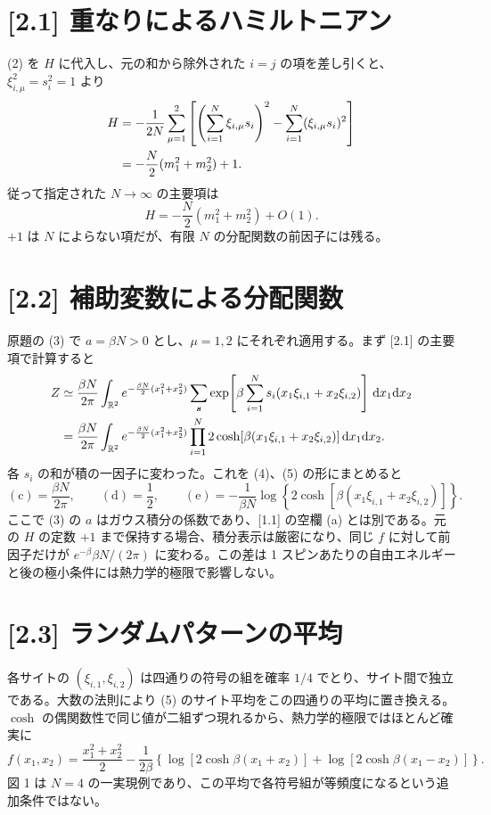 \documentclass[11pt,a4paper]{article}
\begin{document}
\section*{[2.1] 重なりによるハミルトニアン}
(2) を $H$ に代入し、元の和から除外された $i=j$ の項を差し引くと、$\xi_{i,\mu}^2=s_i^2=1$ より
\begin{align}
H&=-\frac{1}{2N}\sum_{\mu=1}^2
\left[\left(\sum_{i=1}^N\xi_{i,\mu}s_i\right)^2
-\sum_{i=1}^N(\xi_{i,\mu}s_i)^2\right]\notag\\
&=-\frac N2(m_1^2+m_2^2)+1.
\end{align}
従って指定された $N\to\infty$ の主要項は
\begin{equation}
\boxed{H=-\frac N2(m_1^2+m_2^2)+O(1)}.
\end{equation}
$+1$ は $N$ によらない項だが、有限 $N$ の分配関数の前因子には残る。

\section*{[2.2] 補助変数による分配関数}
原題の (3) で $a=\beta N>0$ とし、$\mu=1,2$ にそれぞれ適用する。まず [2.1] の主要項で計算すると
\begin{align}
Z&\simeq\frac{\beta N}{2\pi}\int_{\mathbb R^2}
e^{-\frac{\beta N}{2}(x_1^2+x_2^2)}
\sum_{\boldsymbol{s}}
\exp\!\left[\beta\sum_{i=1}^N s_i
(x_1\xi_{i,1}+x_2\xi_{i,2})\right]
\,\mathrm dx_1\mathrm dx_2\notag\\
&=\frac{\beta N}{2\pi}\int_{\mathbb R^2}
e^{-\frac{\beta N}{2}(x_1^2+x_2^2)}
\prod_{i=1}^N
2\cosh[\beta(x_1\xi_{i,1}+x_2\xi_{i,2})]
\,\mathrm dx_1\mathrm dx_2.
\end{align}
各 $s_i$ の和が積の一因子に変わった。これを (4)、(5) の形にまとめると
\begin{equation}
\boxed{(\mathrm c)=\frac{\beta N}{2\pi}},\qquad
\boxed{(\mathrm d)=\frac12},\qquad
\boxed{(\mathrm e)=-\frac{1}{\beta N}
\log\!\left\{2\cosh[\beta(x_1\xi_{i,1}+x_2\xi_{i,2})]\right\}}.
\end{equation}
ここで (3) の $a$ はガウス積分の係数であり、[1.1] の空欄 (a) とは別である。元の $H$ の定数 $+1$ まで保持する場合、積分表示は厳密になり、同じ $f$ に対して前因子だけが $e^{-\beta}\beta N/(2\pi)$ に変わる。この差は 1 スピンあたりの自由エネルギーと後の極小条件には熱力学的極限で影響しない。

\section*{[2.3] ランダムパターンの平均}
各サイトの $(\xi_{i,1},\xi_{i,2})$ は四通りの符号の組を確率 $1/4$ でとり、サイト間で独立である。大数の法則により (5) のサイト平均をこの四通りの平均に置き換える。$\cosh$ の偶関数性で同じ値が二組ずつ現れるから、熱力学的極限ではほとんど確実に
\begin{equation}
\boxed{f(x_1,x_2)=\frac{x_1^2+x_2^2}{2}
-\frac{1}{2\beta}
\left\{\log[2\cosh\beta(x_1+x_2)]
+\log[2\cosh\beta(x_1-x_2)]\right\}}.
\end{equation}
図 1 は $N=4$ の一実現例であり、この平均で各符号組が等頻度になるという追加条件ではない。
\end{document}
